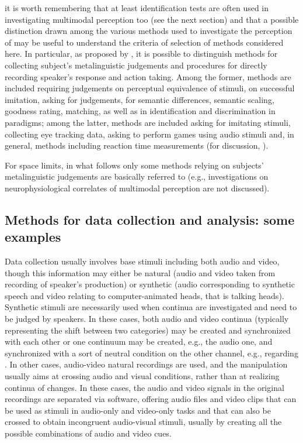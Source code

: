 \documentclass[output=paper]{langsci/langscibook}
\begin{document}
it is worth remembering that at least identification tests are often used in investigating multimodal perception too (see the next section) and that a possible distinction drawn among the various methods used to investigate the perception of  may be useful to understand the criteria of selection of methods considered here. In particular, as proposed by \citet{GiliFivela2008book}, it is possible to distinguish methods for collecting subject’s metalinguistic judgements and procedures for directly recording speaker’s response and action taking. Among the former, methods are included requiring judgements on perceptual equivalence of stimuli, on successful imitation, asking for  judgements, for semantic differences, semantic scaling, goodness rating, matching, as well as in identification and discrimination in  paradigms; among the latter, methods are included asking for imitating stimuli, collecting eye tracking data, asking to perform games using audio stimuli and, in general, methods including reaction time measurements (for discussion, \citealt{GiliFivela2008book}). 

For space limits, in what follows only some methods relying on subjects’ metalinguistic judgements are basically referred to (e.g., investigations on neurophysiological correlates of multimodal perception are not discussed). 
 
\subsection{Methods for data collection and analysis: some examples} \label{sec:gil:3:2}
Data collection usually involves base stimuli including both audio and video, though this information may either be natural (audio and video taken from recording of speaker’s production) or synthetic (audio corresponding to synthetic \linebreak speech and video relating to computer-animated heads, that is talking heads). Synthetic stimuli are necessarily used when continua are investigated and need to be judged by speakers. In these cases, both audio and video continua (typically representing the shift between two categories) may be created and synchronized with each other or one continuum may be created, e.g., the audio one, and synchronized with a sort of neutral condition on the other channel, e.g., regarding . In other cases, audio-video natural recordings are used, and the manipulation usually aims at crossing audio and visual conditions, rather than at realizing continua of changes. In these cases, the audio and video signals in the original recordings are separated via software, offering audio files and video clips that can be used as stimuli in audio-only and video-only tasks and that can also be crossed to obtain incongruent audio-visual stimuli, usually by creating all the possible combinations of audio and video cues. 
\end{document}
